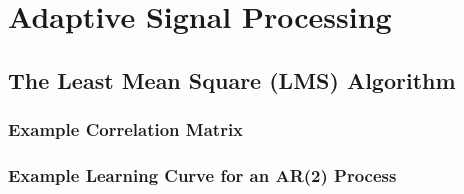 \documentclass[12pt]{article}
\begin{document}
\pagebreak
\section{Adaptive Signal Processing} \label{sec: 2-ASP}
	\subsection{The Least Mean Square (LMS) Algorithm} \label{sec: 2-1-LMS}
		\subsubsection{Example Correlation Matrix}
		\subsubsection{Example Learning Curve for an AR(2) Process}
\end{document}
